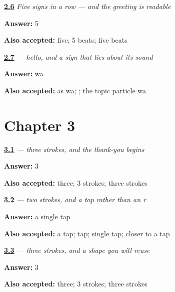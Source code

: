 \noindent\begin{minipage}[t]{\linewidth}
\raggedright
\hyperlink{review-JA-W01-konnichiwa-read-beats}{\textbf{2.6}} \emph{Five signs in a row — and the greeting is readable}\par
\small \textbf{Answer:} 5\par
\footnotesize \textbf{Also accepted:} five; 5 beats; five beats
\end{minipage}\par\medskip

\noindent\begin{minipage}[t]{\linewidth}
\raggedright
\hyperlink{review-JA-C01-konnichiwa-particle}{\textbf{2.7}} \emph{ — hello, and a sign that lies about its sound}\par
\small \textbf{Answer:} wa\par
\footnotesize \textbf{Also accepted:} as wa; ; the topic particle wa
\end{minipage}\par\medskip

\section*{Chapter 3}

\noindent\begin{minipage}[t]{\linewidth}
\raggedright
\hyperlink{review-JA-W03-a-strokes}{\textbf{3.1}} \emph{ — three strokes, and the thank-you begins}\par
\small \textbf{Answer:} 3\par
\footnotesize \textbf{Also accepted:} three; 3 strokes; three strokes
\end{minipage}\par\medskip

\noindent\begin{minipage}[t]{\linewidth}
\raggedright
\hyperlink{review-JA-W03-ri-tap}{\textbf{3.2}} \emph{ — two strokes, and a tap rather than an r}\par
\small \textbf{Answer:} a single tap\par
\footnotesize \textbf{Also accepted:} a tap; tap; single tap; closer to a tap
\end{minipage}\par\medskip

\noindent\begin{minipage}[t]{\linewidth}
\raggedright
\hyperlink{review-JA-W03-ka-strokes}{\textbf{3.3}} \emph{ — three strokes, and a shape you will reuse}\par
\small \textbf{Answer:} 3\par
\footnotesize \textbf{Also accepted:} three; 3 strokes; three strokes
\end{minipage}\par\medskip

